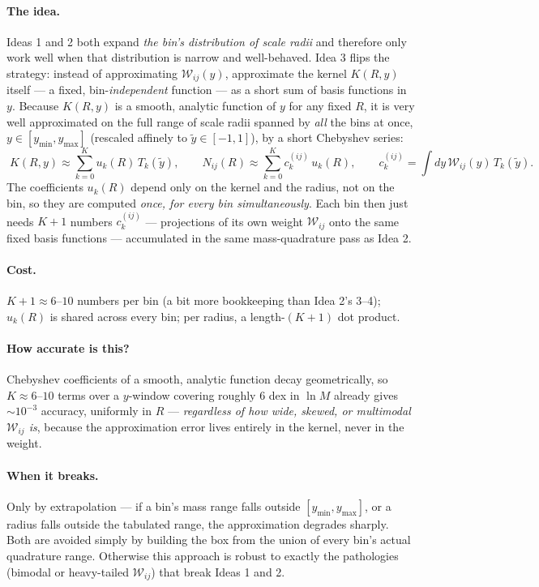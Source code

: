 \documentclass[a4paper, 11pt]{article}
\newcommand{\Wcal}{\mathcal{W}}
\begin{document}
\paragraph{The idea.} Ideas 1 and 2 both expand \emph{the bin's
distribution of scale radii} and therefore only work well when
that distribution is narrow and well-behaved. Idea 3 flips the
strategy: instead of approximating $\Wcal_{ij}(y)$, approximate the
kernel $K(R,y)$ itself --- a fixed, bin-\emph{independent} function
--- as a short sum of basis functions in $y$. Because $K(R,y)$ is a
smooth, analytic function of $y$ for any fixed $R$, it is very well
approximated on the full range of scale radii spanned by
\emph{all} the bins at once, $y\in[y_{\min},y_{\max}]$ (rescaled
affinely to $\tilde y\in[-1,1]$), by a short Chebyshev series:
\begin{equation}
\boxed{\;
K(R,y) \approx \sum_{k=0}^{K} u_k(R)\, T_k(\tilde y),
\qquad
N_{ij}(R) \approx \sum_{k=0}^{K} c_k^{(ij)}\, u_k(R),
\qquad
c_k^{(ij)} = \int\! dy\,\Wcal_{ij}(y)\, T_k(\tilde y).
\;}
\label{eq:approach3}
\end{equation}
The coefficients $u_k(R)$ depend only on the kernel and the
radius, not on the bin, so they are computed \emph{once, for every
bin simultaneously}. Each bin then just needs $K{+}1$ numbers
$c_k^{(ij)}$ --- projections of its own weight $\Wcal_{ij}$ onto the
same fixed basis functions --- accumulated in the same
mass-quadrature pass as Idea 2.

\paragraph{Cost.} $K{+}1\approx6$--$10$ numbers per bin (a bit more
bookkeeping than Idea 2's 3--4); $u_k(R)$ is shared across every
bin; per radius, a length-$(K{+}1)$ dot product.

\paragraph{How accurate is this?} Chebyshev coefficients of a
smooth, analytic function decay geometrically, so $K\approx6$--$10$
terms over a $y$-window covering roughly $6$ dex in $\ln M$
already gives $\sim10^{-3}$ accuracy, uniformly in $R$ ---
\emph{regardless of how wide, skewed, or multimodal $\Wcal_{ij}$
is}, because the approximation error lives entirely in the kernel,
never in the weight.

\paragraph{When it breaks.} Only by extrapolation --- if a bin's
mass range falls outside $[y_{\min},y_{\max}]$, or a radius falls
outside the tabulated range, the approximation degrades sharply.
Both are avoided simply by building the box from the union of
every bin's actual quadrature range. Otherwise this approach is
robust to exactly the pathologies (bimodal or heavy-tailed
$\Wcal_{ij}$) that break Ideas 1 and 2.
\end{document}
